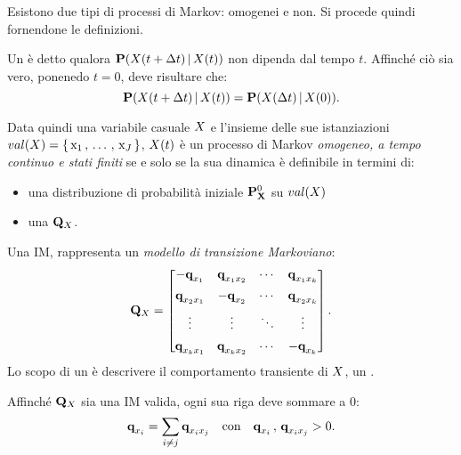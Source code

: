 Esistono due tipi di processi di Markov: omogenei e non. Si procede quindi fornendone le definizioni.

\begin{definizione}[\upcase\mprocess*{} \omog*{}]
\label{defn:homogeneus-markov-process}
Un \mprocess*{} è detto \emph{\omog*{}} qualora $\mathbf{P}(\mathnormal{X}(t + \Delta t)\,\arrowvert\,\mathnormal{X}(t))$ non dipenda dal tempo $t$. Affinché ciò sia vero, ponenedo $t=0$, deve risultare che:
\begin{equation}
\label{eq:homogeneus-markov-process}
\mathbf{P}(\mathnormal{X}(t + \Delta t)\,\arrowvert\,\mathnormal{X}(t))=\mathbf{P}(\mathnormal{X}(\Delta t)\,\arrowvert\,\mathnormal{X}(0))\text{.}
\end{equation}
\end{definizione}
Data quindi una variabile casuale $\mathnormal{X}$ e l'insieme delle sue istanziazioni $val(\mathnormal{X})=\{\,\mathrm{x}_1\,,\,\dotsc\,,\,\mathrm{x}_J\,\}$, $\mathnormal{X}(t)$ è un processo di Markov \emph{omogeneo, a tempo continuo e stati finiti} se e solo se la sua dinamica è definibile in termini di:
\begin{itemize}
    \item una distribuzione di probabilità iniziale $\mathbf{P}^0_{\mathbf{X}}$ su $val(\mathnormal{X})$
    \item una \im*{} $\mathbf{Q}_{\mathnormal{X}}$.
\end{itemize}

\begin{definizione}[\upcase\im*{}]
\label{defn:im}
Una \acf{IM}, rappresenta un \emph{modello di transizione Markoviano}:
\[
\mathbf{Q}_{\mathnormal{X}}=
\begin{bmatrix}
    -\boldsymbol{\textbf{\text{q}}}_{\mathnormal{x}_1}    & \boldsymbol{\textbf{\text{q}}}_{\mathnormal{x}_1\mathnormal{x}_2}& \cdots & \boldsymbol{\textbf{\text{q}}}_{\mathnormal{x}_1\mathnormal{x}_k}   \\[0.5em]
    \boldsymbol{\textbf{\text{q}}}_{\mathnormal{x}_2\mathnormal{x}_1}  & -\boldsymbol{\textbf{\text{q}}}_{\mathnormal{x}_2}  & \cdots & \boldsymbol{\textbf{\text{q}}}_{\mathnormal{x}_2\mathnormal{x}_k}   \\[0.5em]
    \vdots      & \vdots    & \ddots & \vdots       \\[0.5em]
    \boldsymbol{\textbf{\text{q}}}_{\mathnormal{x}_k\mathnormal{x}_1}  & \boldsymbol{\textbf{\text{q}}}_{\mathnormal{x}_k\mathnormal{x}_2}& \cdots & -\boldsymbol{\textbf{\text{q}}}_{\mathnormal{x}_k}
\end{bmatrix}\text{.}
\]
Lo scopo di un \im*{} è descrivere il comportamento transiente di $\mathnormal{X}$, un \mprocess*{} \omog*{}.
\end{definizione}

Affinché $\mathbf{Q}_{\mathnormal{X}}$ sia una \acl{IM} valida, ogni sua riga deve sommare a $0$:
\[
\boldsymbol{\textbf{\text{q}}}_{\mathnormal{x}_i}=\sum_{i \neq j}\boldsymbol{\textbf{\text{q}}}_{\mathnormal{x}_i\mathnormal{x}_j}\quad\text{con}\quad \boldsymbol{\textbf{\text{q}}}_{\mathnormal{x}_i}\,,\,\boldsymbol{\textbf{\text{q}}}_{\mathnormal{x}_i\mathnormal{x}_j}>0\text{.}
\]

